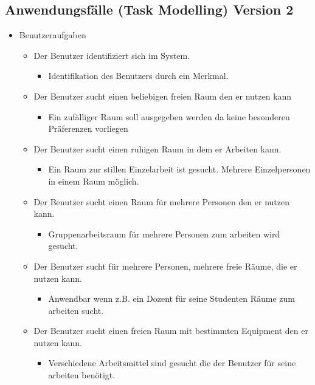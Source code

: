
\subsection{Anwendungsfälle (Task Modelling) Version 2}
\label{anhang:Anwendungsfälle_Task_Modelling_v2}

\begin{itemize}
	\item Benutzeraufgaben
	\begin{itemize}[noitemsep]
		\item Der Benutzer identifiziert sich im System.
		\begin{itemize}
			\item Identifikation des Benutzers durch ein Merkmal.
		\end{itemize}
		\item Der Benutzer sucht einen beliebigen freien Raum den er nutzen kann
		\begin{itemize}
			\item Ein zufälliger Raum soll ausgegeben werden da keine besonderen Präferenzen vorliegen
		\end{itemize}
		\item Der Benutzer sucht einen ruhigen Raum in dem er Arbeiten kann.
		\begin{itemize}
			\item Ein Raum zur stillen Einzelarbeit ist gesucht. Mehrere Einzelpersonen in einem Raum möglich.
		\end{itemize}
		\item Der Benutzer sucht einen Raum für mehrere Personen den er nutzen kann.
		\begin{itemize}
			\item Gruppenarbeitsraum für mehrere Personen zum arbeiten wird gesucht.
		\end{itemize}
		\item Der Benutzer sucht für mehrere Personen, mehrere freie Räume, die er nutzen kann.
		\begin{itemize}
			\item Anwendbar wenn z.B. ein Dozent für seine Studenten Räume zum arbeiten sucht.
		\end{itemize}
		\item Der Benutzer sucht einen freien Raum mit bestimmten Equipment den er nutzen kann.
		\begin{itemize}
			\item Verschiedene Arbeitsmittel sind gesucht die der Benutzer für seine arbeiten benötigt.

\end{itemize}
\end{itemize}
\end{itemize}
